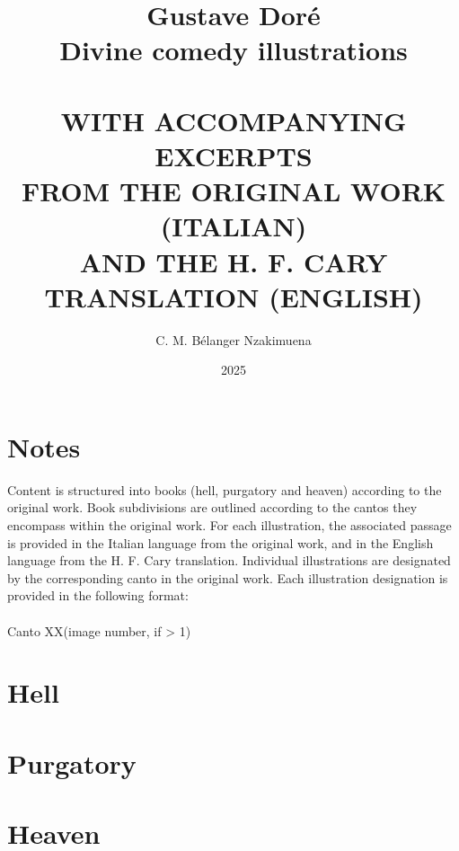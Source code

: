 \documentclass[a4paper,12pt,]{book}
\newcommand\tab[1][1cm]{\hspace*{#1}}
\begin{document}
\title{ 
\Huge{\textbf{Gustave Doré \protect\\ Divine comedy illustrations}} \\~\\
\small{\uppercase{with accompanying excerpts \protect\\ from the original work (Italian) \protect\\ and the H. F. Cary translation (English)}}
} %
\author{C. M. Bélanger Nzakimuena}
\date{2025} %
\maketitle

\setlength\parindent{0pt} %
\let\cleardoublepage\clearpage %

\frontmatter
\tableofcontents %

\chapter*{Notes}
Content is structured into books (hell, purgatory and heaven) according to the original work. Book subdivisions are outlined according to the cantos they encompass within the original work. For each illustration, the associated passage is provided in the Italian language from the original work, and in the English language from the H. F. Cary translation. Individual illustrations are designated by the corresponding canto in the original work. Each illustration designation is provided in the following format: \\~\\
\tab\tab\tab\tab Canto XX(\textquotesingle image number\textquotesingle, if > 1)

\mainmatter

\chapter{Hell}
\newpage


\chapter{Purgatory}
\newpage


\chapter{Heaven}
\newpage


\nocite{alighieri2009divine} %
\nocite{alighieri1868commedia}

\cleardoublepage
{} %

\end{document}
